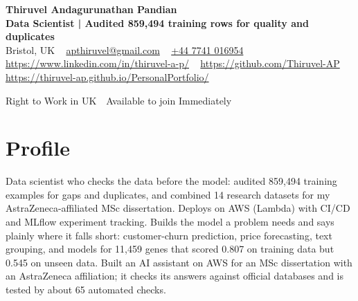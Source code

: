 \documentclass[a4paper,11pt]{article}
\newcommand{\num}[1]{\textbf{#1}}   %
\begin{document}
\begin{center}
  {\LARGE\bfseries Thiruvel Andagurunathan Pandian} \\[3pt]
  {\color{headernavy}\small\textbf{Data Scientist | Audited \num{859,494} training rows for quality and duplicates}} \\[3pt]
  {\small
  Bristol, UK\nobreak\ \,\textbar\, \href{mailto:apthiruvel@gmail.com}{apthiruvel@gmail.com}\nobreak\ \,\textbar\, \href{tel:+447741016954}{+44 7741 016954}\nobreak\ \,\textbar\, \href{https://www.linkedin.com/in/thiruvel-a-p/}{https://www.linkedin.com/in/thiruvel-a-p/}\nobreak\ \,\textbar\, \href{https://github.com/Thiruvel-AP}{https://github.com/Thiruvel-AP}\nobreak\ \,\textbar\, \href{https://thiruvel-ap.github.io/PersonalPortfolio/}{https://thiruvel-ap.github.io/PersonalPortfolio/}}\par\vspace{4pt}
  \noindent{} Right to Work in UK \,\textbar\, Available to join Immediately
\end{center}

\section{Profile}
Data scientist who checks the data before the model: audited 859,494 training examples for gaps and duplicates, and combined 14 research datasets for my AstraZeneca-affiliated MSc dissertation. Deploys on AWS (Lambda) with CI/CD and MLflow experiment tracking. Builds the model a problem needs and says plainly where it falls short: customer-churn prediction, price forecasting, text grouping, and models for 11,459 genes that scored 0.807 on training data but 0.545 on unseen data. Built an AI assistant on AWS for an MSc dissertation with an AstraZeneca affiliation; it checks its answers against official databases and is tested by about 65 automated checks.
\end{document}
